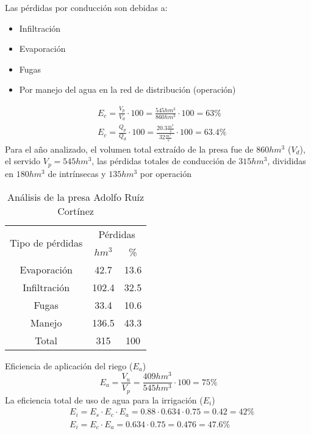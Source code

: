 Las pérdidas por conducción son debidas a:
\begin{itemize}
    \item Infiltración
    \item Evaporación
    \item Fugas
    \item Por manejo del agua en la red de distribución (operación)
\end{itemize}
\begin{align*}
    &E_c = \frac{V_p}{V_d} \cdot 100 = \frac{545hm^3}{860hm^3} \cdot 100 = 63\%\\
    &E_c = \frac{Q_p}{Q_d} \cdot 100 = \frac{20.3 \frac{m^3}{s}}{32 \frac{m^3}{s}} \cdot 100 = 63.4\%
\end{align*}
Para el año analizado, el volumen total extraído de la presa fue de $860hm^3$ ($V_d$), el servido $V_p=545hm^3$, las pérdidas totales de conducción de $315hm^3$, divididas en $180hm^3$ de intrínsecas y $135hm^3$ por operación
\begin{table}[h!]
    \begin{tabular}{@{}ccc@{}}
    \toprule
    \multirow{2}{*}{Tipo de pérdidas} & \multicolumn{2}{c}{Pérdidas} \\
                                      & $hm^3$         & \%          \\ \midrule
    Evaporación                       & 42.7           & 13.6        \\
    Infiltración                      & 102.4          & 32.5        \\
    Fugas                             & 33.4           & 10.6        \\
    Manejo                            & 136.5          & 43.3        \\
    Total                             & 315            & 100         \\ \bottomrule
    \end{tabular}
    \caption{Análisis de la presa Adolfo Ruíz Cortínez}
    \label{taboc1}
\end{table}
Eficiencia de aplicación del riego ($E_a$)
\begin{equation*}
    E_a = \frac{V_u}{V_p} = \frac{409hm^3}{545hm^3} \cdot 100 = 75\%
\end{equation*}
La eficiencia total de uso de agua para la irrigación ($E_i$)
\begin{align*}
    &E_i = E_s \cdot E_c \cdot E_a = 0.88 \cdot 0.634 \cdot 0.75 = 0.42 = 42\%\\
    &E_i = E_c \cdot E_a = 0.634 \cdot 0.75 = 0.476 = 47.6\%
\end{align*}